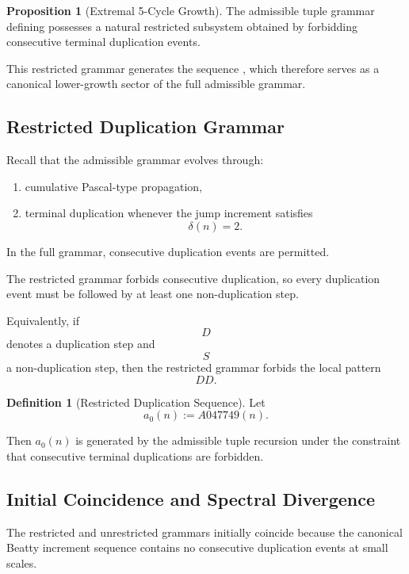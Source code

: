 \documentclass[12pt, oneside]{article}
\numberwithin{equation}{section}
\theoremstyle{definition}
\newtheorem{definition}{Definition}[section]
\newtheorem{proposition}{Proposition}[section]
\theoremstyle{plain}
\theoremstyle{remark}
\begin{document}
\begin{proposition}[Extremal 5-Cycle Growth]
The admissible tuple grammar defining  possesses a natural
restricted subsystem obtained by forbidding consecutive terminal
duplication events.

This restricted grammar generates the sequence , which
therefore serves as a canonical lower-growth sector of the full
admissible grammar.


\subsection{Restricted Duplication Grammar}

Recall that the admissible grammar evolves through:
\begin{enumerate}
\item cumulative Pascal-type propagation,
\item terminal duplication whenever the jump increment satisfies
\[
\delta(n)=2.
\]
\end{enumerate}

In the full grammar, consecutive duplication events are permitted.

The restricted grammar forbids consecutive duplication, so every
duplication event must be followed by at least one non-duplication step.

Equivalently, if
\[
D
\]
denotes a duplication step and
\[
S
\]
a non-duplication step, then the restricted grammar forbids the local
pattern
\[
DD.
\]


\begin{definition}[Restricted Duplication Sequence]
Let
\[
a_0(n):=A047749(n).
\]

Then \(a_0(n)\) is generated by the admissible tuple recursion under
the constraint that consecutive terminal duplications are forbidden.
\end{definition}


\subsection{Initial Coincidence and Spectral Divergence}

The restricted and unrestricted grammars initially coincide because the
canonical Beatty increment sequence contains no consecutive duplication
events at small scales.


\end{proposition}
\end{document}
